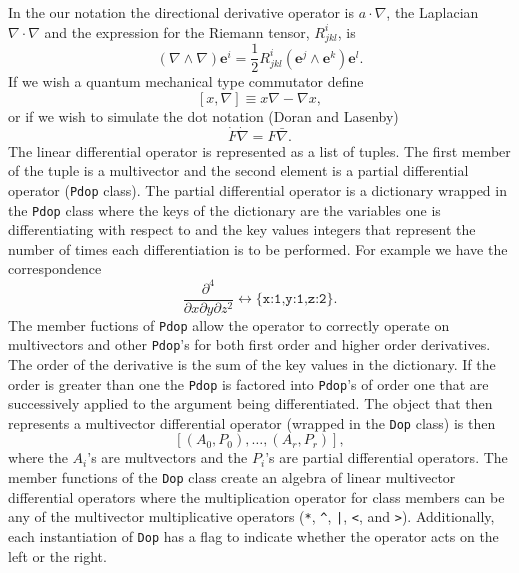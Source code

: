 \documentclass[12pt,twoside,openright]{memoir}
\newcommand{\bm}[1]{\boldsymbol{#1}}
\newcommand{\bfrac}[2]{\displaystyle\frac{#1}{#2}}
\newcommand{\lp}{\left (}
\newcommand{\rp}{\right )}
\newcommand{\half}{\frac{1}{2}}
\newcommand{\W}{\wedge}
\newcommand{\lbrk}{\left [}
\newcommand{\rbrk}{\right ]}
\newcommand{\com}[1]{\lbrk {#1} \rbrk}
\newcommand{\paren}[1]{\lp {#1} \rp}
\newcommand{\be}{\begin{equation}}
\newcommand{\ee}{\end{equation}}
\newcommand{\eb}{\bm{e}}
\newcommand{\T}[1]{\texttt{#1}}
\begin{document}
In the our notation the directional derivative operator is $a\cdot\nabla$, the Laplacian 
$\nabla\cdot\nabla$ and the expression for the Riemann tensor, $R^{i}_{jkl}$, is
\be
	\paren{\nabla\W\nabla}\eb^{i} = \half R^{i}_{jkl}\paren{\eb^{j}\W\eb^{k}}\eb^{l}.
\ee
If we wish a quantum mechanical type commutator define
\be
	\com{x,\nabla} \equiv x\nabla - \nabla x,
\ee
or if we wish to simulate the dot notation (Doran and Lasenby)
\be
	\dot{F}\dot{\nabla} = F\bar{\nabla}.
\ee
The linear differential operator is represented as a list of tuples.  The first member of the tuple is a multivector and the second
element is a partial differential operator (\T{Pdop} class).  The partial differential operator is a dictionary wrapped in the \T{Pdop}
class where the keys of the dictionary are the variables one is differentiating with respect to and the key values integers that represent
the number of times each differentiation is to be performed.  For example we have the correspondence 
\be
	\bfrac{\partial^{4}}{\partial x \partial y \partial z^{2}}  \leftrightarrow \T{\{x:1,y:1,z:2\}}.
\ee
The member fuctions of \T{Pdop} allow the operator to correctly operate on multivectors and other \T{Pdop}'s for both first order and
higher order derivatives.  The order of the derivative is the sum of the key values in the dictionary.  If the order is greater 
than one the \T{Pdop} is factored into \T{Pdop}'s of order one that are successively applied to the argument being differentiated.   
The object that then represents a multivector differential operator (wrapped in the \T{Dop} class) is then
\be
	\left [ \paren{A_{0},P_{0}}, \dots , \paren{A_{r},P_{r}} \right ],\label{doprep}
\ee
where the $A_{i}$'s are multvectors and the $P_{i}$'s are partial differential operators.  The member functions of the \T{Dop} class create
an algebra of linear multivector differential operators where the multiplication operator for class members can be any of the multivector
multiplicative operators (\T{*}, \T{\^}, \T{|}, \T{<}, and \T{>}).  Additionally, each instantiation of \T{Dop} has a flag to indicate 
whether the operator acts on the left or the right.
\end{document}
